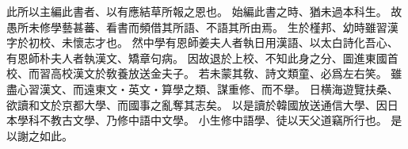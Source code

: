 此所以主編此書者、以有應結草所報之恩也。
始編此書之時、猶未過本科生。
故愚所未修學藝甚蕃、看書而頻借其所語、不語其所由焉。
生於槿邦、幼時雖習漢字於初校、未懷志才也。
然中學有恩師姜夫人者執日用漢語、以太白詩化吾心、有恩師朴夫人者執漢文、矯章句病。
因故退於上校、不知此身之分、圖進東國首校、而習高校漢文於敎養放送金夫子。
若未蒙其敎、詩文類童、必爲左右笑。
雖盡心習漢文、而遠東文・英文・算學之類、謀重修、而不擧。
日横海遊覽扶桑、欲讀和文於京都大學、而國事之亂奪其志矣。
以是讀於韓國放送通信大學、因日本學科不教古文學、乃修中語中文學。
小生修中語學、徒以天父道竊所行也。
是以謝之如此。

